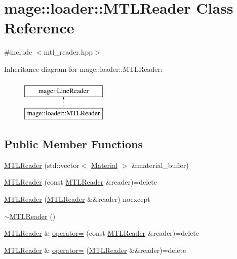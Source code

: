 \hypertarget{classmage_1_1loader_1_1_m_t_l_reader}{}\section{mage\+:\+:loader\+:\+:M\+T\+L\+Reader Class Reference}
\label{classmage_1_1loader_1_1_m_t_l_reader}


{\ttfamily \#include $<$mtl\+\_\+reader.\+hpp$>$}

Inheritance diagram for mage\+:\+:loader\+:\+:M\+T\+L\+Reader\+:\begin{figure}[H]
\begin{center}
\leavevmode
\includegraphics[height=2.000000cm]{classmage_1_1loader_1_1_m_t_l_reader}
\end{center}
\end{figure}
\subsection*{Public Member Functions}
\begin{DoxyCompactItemize}
\item 
\hyperlink{classmage_1_1loader_1_1_m_t_l_reader_a47b08a358e5b84aca18b62369bb7a6fa}{M\+T\+L\+Reader} (std\+::vector$<$ \hyperlink{classmage_1_1_material}{Material} $>$ \&material\+\_\+buffer)
\item 
\hyperlink{classmage_1_1loader_1_1_m_t_l_reader_a00a161e4100e1d5df1315b4ef92d7e35}{M\+T\+L\+Reader} (const \hyperlink{classmage_1_1loader_1_1_m_t_l_reader}{M\+T\+L\+Reader} \&reader)=delete
\item 
\hyperlink{classmage_1_1loader_1_1_m_t_l_reader_a7278e4533633eb7dcba4b711505a1f24}{M\+T\+L\+Reader} (\hyperlink{classmage_1_1loader_1_1_m_t_l_reader}{M\+T\+L\+Reader} \&\&reader) noexcept
\item 
\hyperlink{classmage_1_1loader_1_1_m_t_l_reader_a03836eca33fe646ea5d515a5cb2b2eb6}{$\sim$\+M\+T\+L\+Reader} ()
\item 
\hyperlink{classmage_1_1loader_1_1_m_t_l_reader}{M\+T\+L\+Reader} \& \hyperlink{classmage_1_1loader_1_1_m_t_l_reader_a2a06066535d68e35fd1456b683953947}{operator=} (const \hyperlink{classmage_1_1loader_1_1_m_t_l_reader}{M\+T\+L\+Reader} \&reader)=delete
\item 
\hyperlink{classmage_1_1loader_1_1_m_t_l_reader}{M\+T\+L\+Reader} \& \hyperlink{classmage_1_1loader_1_1_m_t_l_reader_ad5b378d2d0959236f07a6cf8ad086c32}{operator=} (\hyperlink{classmage_1_1loader_1_1_m_t_l_reader}{M\+T\+L\+Reader} \&\&reader)=delete
\end{DoxyCompactItemize}
